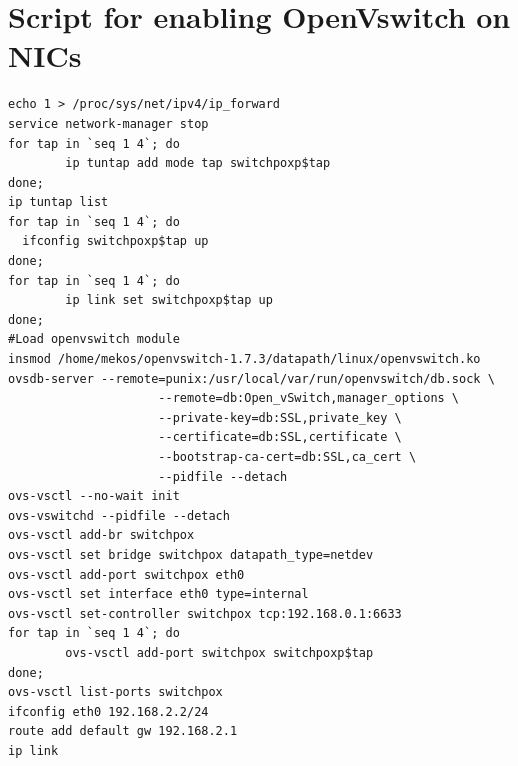 \documentclass[12pt,english,oneside]{book}
\begin{document}
\chapter{Script for enabling OpenVswitch on NICs}
\label{app:openvscript}
\lstset{language=bash,frame=lines}
\begin{lstlisting}
echo 1 > /proc/sys/net/ipv4/ip_forward
service network-manager stop
for tap in `seq 1 4`; do
        ip tuntap add mode tap switchpoxp$tap
done;
ip tuntap list
for tap in `seq 1 4`; do
  ifconfig switchpoxp$tap up
done;
for tap in `seq 1 4`; do
        ip link set switchpoxp$tap up
done;
#Load openvswitch module
insmod /home/mekos/openvswitch-1.7.3/datapath/linux/openvswitch.ko
ovsdb-server --remote=punix:/usr/local/var/run/openvswitch/db.sock \
                     --remote=db:Open_vSwitch,manager_options \
                     --private-key=db:SSL,private_key \
                     --certificate=db:SSL,certificate \
                     --bootstrap-ca-cert=db:SSL,ca_cert \
                     --pidfile --detach
ovs-vsctl --no-wait init
ovs-vswitchd --pidfile --detach
ovs-vsctl add-br switchpox
ovs-vsctl set bridge switchpox datapath_type=netdev
ovs-vsctl add-port switchpox eth0 
ovs-vsctl set interface eth0 type=internal
ovs-vsctl set-controller switchpox tcp:192.168.0.1:6633
for tap in `seq 1 4`; do
        ovs-vsctl add-port switchpox switchpoxp$tap
done;
ovs-vsctl list-ports switchpox
ifconfig eth0 192.168.2.2/24
route add default gw 192.168.2.1
ip link
\end{lstlisting}

\cleardoublepage


\cleardoublepage



\nocite{*}
\end{document}
